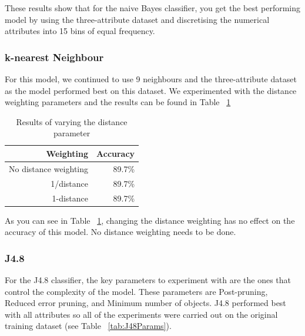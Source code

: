 \documentclass[a4paper,11pt]{article}
\begin{document}
These results show that for the naive Bayes classifier, you get the best performing model by using the three-attribute
dataset and discretising the numerical attributes into 15 bins of equal frequency.

\subsubsection{k-nearest Neighbour}

For this model, we continued to use 9 neighbours and the three-attribute dataset as the model performed best on this dataset.
 We experimented with the distance weighting parameters and the results can be found in Table ~\ref{tab:kNNParams}

\begin{table}[H]
  \begin{center}
    \begin{tabular}{r | r}
      Weighting & Accuracy  \\ \hline
      No distance weighting & 89.7\% \\
      1/distance & 89.7\% \\
      1-distance & 89.7\% \\
    \end{tabular}
  \end{center}
  \caption{Results of varying the distance parameter}
  \label{tab:kNNParams}
\end{table}

As you can see in Table ~\ref{tab:kNNParams}, changing the distance weighting has no effect on the accuracy of this model.
No distance weighting needs to be done.

\subsubsection{J4.8}

For the J4.8 classifier, the key parameters to experiment with are the ones that control the complexity of the model.
These parameters are Post-pruning, Reduced error pruning, and Minimum number of objects. J4.8 performed best with
all attributes so all of the experiments were carried out on the original training dataset (see Table ~\ref{tab:J48Params}).
\end{document}
